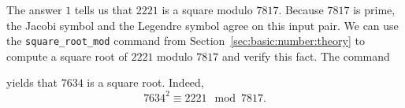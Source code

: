 
The answer $1$ tells us that $2221$ is a square modulo $7817.$
Because $7817$ is prime, the Jacobi symbol and the Legendre symbol agree on this input pair. 
We can use the \verb'square_root_mod' command from Section~\ref{sec:basic:number:theory} 
to compute a square root of $2221$ modulo $7817$ and verify this fact.
The command 
{\tt

}
yields that $7634$ is a square root. Indeed,
$$
7634^2 \equiv 2221 \mod 7817.
$$

\bigskip


